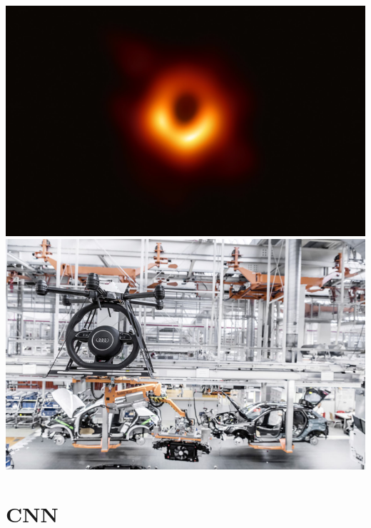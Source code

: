 \documentclass[11pt]{beamer}
\begin{document}
\begin{frame}
\begin{center}
\includegraphics[scale=0.1]{img6.png}
\includegraphics[scale=0.1]{img7.png}
\end{center}
\end{frame}

\section{CNN}
\end{document}
